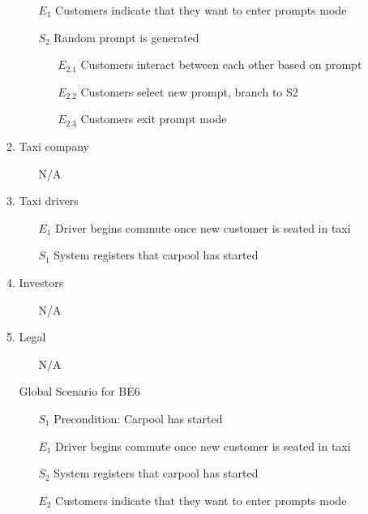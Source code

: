 \documentclass[]{article}
\begin{document}
\begin{enumerate}[{\textbf{BE}}1.]
\begin{enumerate}[{VP6}.1]
\begin{enumerate}
                \item[$E_1$] Customers indicate that they want to enter prompts mode
                \item[$S_2$] Random prompt is generated
                \begin{enumerate}
                    \item[$E_{2.1}$] Customers interact between each other based on prompt
                    \item[$E_{2.2}$] Customers select new prompt, branch to S2
                    \item[$E_{2.3}$] Customers exit prompt mode
                \end{enumerate}
            \end{enumerate}
        \item Taxi company
            \begin{enumerate}
                \item[N/A]
            \end{enumerate}
        \item Taxi drivers
            \begin{enumerate}
                \item[$E_1$] Driver begins commute once new customer is seated in taxi
                \item[$S_1$] System registers that carpool has started
            \end{enumerate}
        \item Investors
            \begin{enumerate}
                \item[N/A]
            \end{enumerate}
        \item Legal
            \begin{enumerate}
                \item[N/A]
            \end{enumerate}
        \item[Global] Scenario for BE6
            \begin{enumerate}
                \item[$S_1$] Precondition: Carpool has started
                \item[$E_1$] Driver begins commute once new customer is seated in taxi
                \item[$S_2$] System registers that carpool has started
                \item[$E_2$] Customers indicate that they want to enter prompts mode

\end{enumerate}
\end{enumerate}
\end{enumerate}
\end{document}
